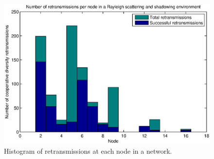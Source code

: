 \begin{figure}
\centering
\includegraphics[scale=.5]{figures/histogram}
\caption{Histogram of retransmissions at each node in a network.}
\label{fig:histogram}
\end{figure}